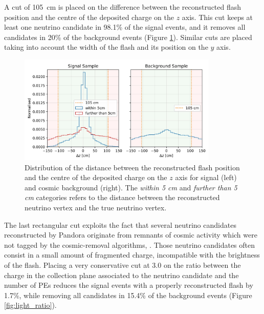 A cut of \SI{105}{\cm} is placed on the difference between the reconstructed flash position and the centre of the deposited charge on the $z$ axis. This cut keeps at least one neutrino candidate in 98.1\% of the signal events, and it removes all candidates in 20\% of the background events (Figure \ref{fig:z_cut}). 
Similar cuts are placed taking into account the width of the flash and its position on the $y$ axis. 

\begin{figure}[htbp]
\centering
\includegraphics[width=0.85\textwidth]{figures/z_cut.jpg} 
\caption{Distribution of the distance between the reconstructed flash position and the centre of the deposited charge on the $z$ axis for signal (left) and cosmic background (right). The \emph{within 5 cm} and \emph{further than 5 cm} categories refers to the distance between the reconstructed neutrino vertex and the true neutrino vertex.} 
\label{fig:z_cut}
\end{figure}

The last rectangular cut exploits the fact that several neutrino candidates reconstructed by Pandora originate from remnants of cosmic activity which were not tagged by the cosmic-removal algorithms, . Those neutrino candidates often consist in a small amount of fragmented charge, incompatible with the brightness of the flash. Placing a very conservative cut at 3.0 on the ratio between the charge in the collection plane associated to the neutrino candidate and the number of PEs reduces the signal events with a properly reconstructed flash by 1.7\%, while removing all candidates in 15.4\% of the background events (Figure \ref{fig:light_ratio}).

